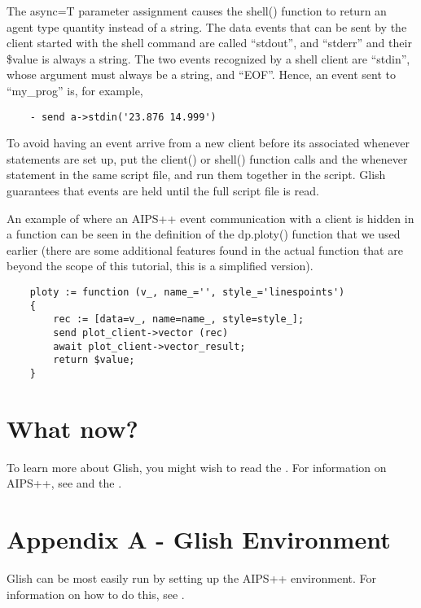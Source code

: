 The async=T parameter assignment causes the shell() function to return an
agent type quantity instead of a string.  The data events that can be sent
by the client started with the shell command are called ``stdout'', 
and ``stderr'' and their \$value is always a string.  The two 
events recognized by a shell client are
``stdin'', whose argument must always be a string, and ``EOF''.  Hence, an
event sent to ``my\_prog'' is, for example,

\begin{verbatim}
	- send a->stdin('23.876 14.999')
\end{verbatim}

    To avoid having an event arrive from a new client before its associated
whenever statements are set up, put the client() or shell() function calls
and the whenever statement in the same script file, and run them together in
the script.  Glish guarantees that events are held until the full script
file is read.

    An example of where an AIPS++ event communication with a client is
hidden in a function can be seen in the definition of the dp.ploty() 
function that we
used earlier (there are some additional features found in the
actual function that are beyond the scope of this tutorial, this is
a simplified version).

\begin{verbatim}
	ploty := function (v_, name_='', style_='linespoints')
	{
	    rec := [data=v_, name=name_, style=style_];
	    send plot_client->vector (rec)
	    await plot_client->vector_result;
	    return $value;
	}
\end{verbatim}

\section{What now?}

To learn more about Glish, you might wish to read the
. For information on AIPS++,
see  and the
.

\section{Appendix A - Glish Environment}

Glish can be most easily run by setting up the AIPS++ environment.
For information on how to do this, see .

